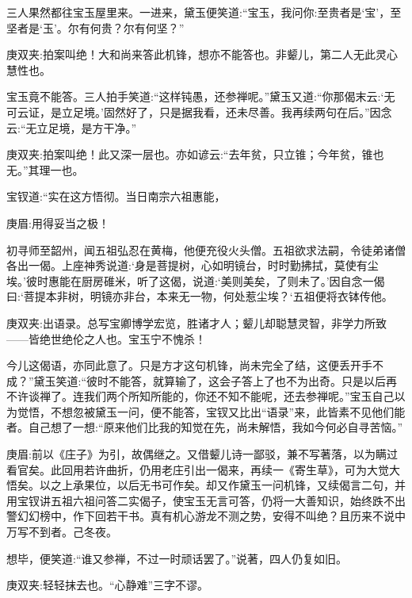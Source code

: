 \begin{parag}
    三人果然都往宝玉屋里来。一进来，黛玉便笑道:“宝玉，我问你:至贵者是‘宝’，至坚者是‘玉’。尔有何贵？尔有何坚？”\begin{note}庚双夹:拍案叫绝！大和尚来答此机锋，想亦不能答也。非颦儿，第二人无此灵心慧性也。\end{note}宝玉竟不能答。三人拍手笑道:“这样钝愚，还参禅呢。”黛玉又道:“你那偈末云:‘无可云证，是立足境。’固然好了，只是据我看，还未尽善。我再续两句在后。”因念云:“无立足境，是方干净。”\begin{note}庚双夹:拍案叫绝！此又深一层也。亦如谚云:“去年贫，只立锥；今年贫，锥也无。”其理一也。\end{note}宝钗道:“实在这方悟彻。当日南宗六祖惠能，\begin{note}庚眉:用得妥当之极！\end{note}初寻师至韶州，闻五祖弘忍在黄梅，他便充役火头僧。五祖欲求法嗣，令徒弟诸僧各出一偈。上座神秀说道:‘身是菩提树，心如明镜台，时时勤拂拭，莫使有尘埃。’彼时惠能在厨房碓米，听了这偈，说道:‘美则美矣，了则未了。’因自念一偈曰:‘菩提本非树，明镜亦非台，本来无一物，何处惹尘埃？‘五祖便将衣钵传他。\begin{note}庚双夹:出语录。总写宝卿博学宏览，胜诸才人；颦儿却聪慧灵智，非学力所致——皆绝世绝伦之人也。宝玉宁不愧杀！\end{note}今儿这偈语，亦同此意了。只是方才这句机锋，尚未完全了结，这便丢开手不成？”黛玉笑道:“彼时不能答，就算输了，这会子答上了也不为出奇。只是以后再不许谈禅了。连我们两个所知所能的，你还不知不能呢，还去参禅呢。”宝玉自己以为觉悟，不想忽被黛玉一问，便不能答，宝钗又比出“语录”来，此皆素不见他们能者。自己想了一想:“原来他们比我的知觉在先，尚未解悟，我如今何必自寻苦恼。”\begin{note}庚眉:前以《庄子》为引，故偶继之。又借颦儿诗一鄙驳，兼不写著落，以为瞒过看官矣。此回用若许曲折，仍用老庄引出一偈来，再续一《寄生草》，可为大觉大悟矣。以之上承果位，以后无书可作矣。却又作黛玉一问机锋，又续偈言二句，并用宝钗讲五祖六祖问答二实偈子，使宝玉无言可答，仍将一大善知识，始终跌不出警幻幻榜中，作下回若干书。真有机心游龙不测之势，安得不叫绝？且历来不说中万写不到者。己冬夜。\end{note}想毕，便笑道:“谁又参禅，不过一时顽话罢了。”说著，四人仍复如旧。\begin{note}庚双夹:轻轻抹去也。“心静难”三字不谬。\end{note}
\end{parag}


